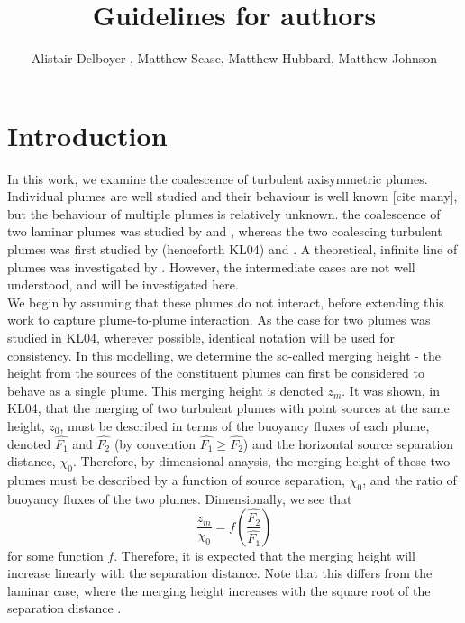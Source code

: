\documentclass{jfm}
\title{Guidelines for authors}
\author{Alistair Delboyer\aff{1}
	\corresp{\email{alistair.delboyer@nottingham.ac.uk}},
	Matthew Scase\aff{1}, Matthew Hubbard\aff{1}, Matthew Johnson\aff{2}}
\affiliation{\aff{1}School of Mathematical Sciences, University Park, Nottingham, NG7 2RD
	\aff{2}School of Geography, Sir Clive Granger Building, Nottingham, NG7 2RD}
\begin{document}
	
	\maketitle
	\section{Introduction}
	In this work, we examine the coalescence of turbulent axisymmetric plumes. Individual plumes are well studied and their behaviour is well known [cite many], but the behaviour of multiple plumes is relatively unknown. the coalescence of two laminar plumes was studied by \citet{moses1991dynamics} and \citet{moses1993experimental}, whereas the two coalescing turbulent plumes was first studied by \citet{kaye2004coalescing} (henceforth KL04) and \cite{cenedese2014entrainment}. A theoretical, infinite line of plumes was investigated by \citet{rooney2015merging}. However, the intermediate cases are not well understood, and will be investigated here.\\
	
	\noindent We begin by assuming that these plumes do not interact, before extending this work to capture plume-to-plume interaction. As the case for two plumes was studied in KL04, wherever possible, identical notation will be used for consistency. In this modelling, we determine the so-called merging height - the height from the sources of the constituent plumes can first be considered to behave as a single plume. This merging height is denoted $z_m$. It was shown, in KL04, that the merging of two turbulent plumes with point sources at the same height, $z_0$, must be described in terms of the buoyancy fluxes of each plume, denoted $\hat{F_1}$ and $\hat{F_2}$ (by convention $\hat{F_1} \geq \hat{F_2}$) and the horizontal source separation distance, $\chi_0$. Therefore, by dimensional anaysis, the merging height of these two plumes must be described by a function of source separation, $\chi_0$, and the ratio of buoyancy fluxes of the two plumes. Dimensionally, we see that
	\begin{equation}
		\frac{z_m}{\chi_0} = f\left(\frac{\hat{F_2}}{\hat{F_1}}\right)
	\end{equation}
	for some function $f$. Therefore, it is expected that the merging height will increase linearly with the separation distance. Note that this differs from the laminar case, where the merging height increases with the square root of the separation distance \citep{moses1991dynamics,moses1993experimental}.\\
	
\end{document}
